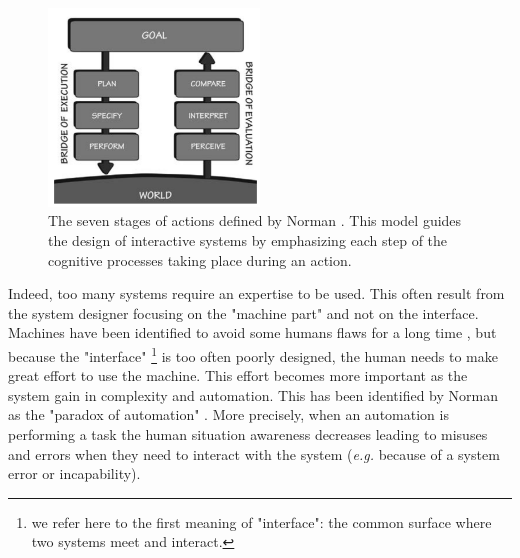 \documentclass[a4paper,11pt,twoside]{StyleThese}
\begin{document}
\begin{figure}
\centering
\includegraphics[width=0.5\textwidth]{figures/chapter1/Norman_7_stages_action.png}
\caption{The seven stages of actions defined by Norman \cite{norman2013design}. This model guides the design of interactive systems by emphasizing each step of the cognitive processes taking place during an action.}
\label{fig:norman_7_stages}
\end{figure}

Indeed, too many systems require an expertise to be used. This often result from the system designer focusing on the "machine part" and not on the interface. Machines have been identified to avoid some humans flaws for a long time \cite{fitts_human_1951}, but because the "interface" \footnote{we refer here to the first meaning of "interface": the common surface where two systems meet and interact.} is too often poorly designed, the human needs to make great effort to use the machine. This effort becomes more important as the system gain in complexity and automation. This has been identified by Norman as the "paradox of automation" \cite{norman2013design}. More precisely, when an automation is performing a task the human situation awareness \cite{endsley_design_1988} decreases leading to misuses and errors when they need to interact with the system (\textit{e.g.} because of a system error or incapability).
\end{document}
